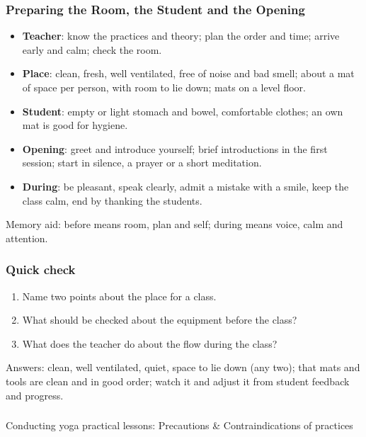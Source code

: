\begin{frame}[fragile]\frametitle{Preparing the Room, the Student and the Opening}

    \begin{itemize}
        \item \textbf{Teacher}: know the practices and theory; plan the order and time; arrive early and calm; check the room.
        \item \textbf{Place}: clean, fresh, well ventilated, free of noise and bad smell; about a mat of space per person, with room to lie down; mats on a level floor.
        \item \textbf{Student}: empty or light stomach and bowel, comfortable clothes; an own mat is good for hygiene.
        \item \textbf{Opening}: greet and introduce yourself; brief introductions in the first session; start in silence, a prayer or a short meditation.
        \item \textbf{During}: be pleasant, speak clearly, admit a mistake with a smile, keep the class calm, end by thanking the students.
    \end{itemize}
    Memory aid: before means room, plan and self; during means voice, calm and attention.

\end{frame}

\begin{frame}[fragile]\frametitle{Quick check}

    \begin{enumerate}
        \item Name two points about the place for a class.
        \item What should be checked about the equipment before the class?
        \item What does the teacher do about the flow during the class?
    \end{enumerate}
    {\small Answers: clean, well ventilated, quiet, space to lie down (any two); that mats and tools are clean and in good order; watch it and adjust it from student feedback and progress.}

\end{frame}


\begin{frame}[fragile]\frametitle{}
\begin{center}
{\Large Conducting yoga practical lessons: Precautions \& Contraindications of practices}
\end{center}
\end{frame}


